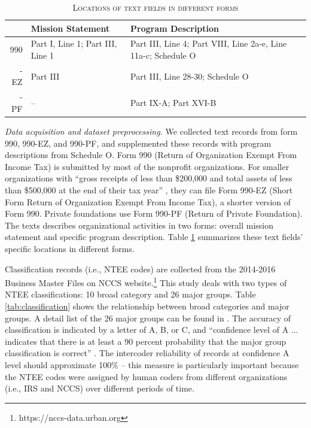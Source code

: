 \documentclass[11pt]{article}
\begin{document}
\begin{table}[]
    \centering
    \begin{tabularx}{0.8\textwidth}{r|X|X}
    	 \hline
         & Mission Statement & Program Description \\
         \hline
         990 & Part I, Line 1; Part III, Line 1 & Part III, Line 4; Part VIII, Line 2a-e, Line 11a-c; Schedule O \\
         \hdashline
         990-EZ & Part III & Part III, Line 28-30; Schedule O \\
         \hdashline
         990-PF & -- & Part IX-A; Part XVI-B \\
         \hline
    \end{tabularx}
    \caption{\textsc{Locations of text fields in different forms}} \label{tab:text_loc}
\end{table}

\textit{Data acquisition and dataset preprocessing.} We collected text records from form 990, 990-EZ, and 990-PF, and supplemented these records with program descriptions from Schedule O. Form 990 (Return of Organization Exempt From Income Tax) is submitted by most of the nonprofit organizations. For smaller organizations with ``gross receipts of less than \$200,000 and total assets of less than \$500,000 at the end of their tax year'' \parencite[1]{USInternalRevenueService2017InstructionsForm2018}, they can file Form 990-EZ (Short Form Return of Organization Exempt From Income Tax), a shorter version of Form 990. Private foundations use Form 990-PF (Return of Private Foundation). The texts describes organizational activities in two forms: overall mission statement and specific program description. Table \ref{tab:text_loc} summarizes these text fields' specific locations in different forms.

Classification records (i.e., NTEE codes) are collected from the 2014-2016 Business Master Files on NCCS website.\footnote{https://nccs-data.urban.org} This study deals with two types of NTEE classifications: 10 broad category and 26 major groups. Table \ref{tab:classification} shows the relationship between broad categories and major groups. A detail list of the 26 major groups can be found in \textcite{USInternalRevenueServiceExemptOrganizationsBusiness2014}. The accuracy of classification is indicated by a letter of A, B, or C, and ``confidence level of A ... indicates that there is at least a 90 percent probability that the major group classification is correct'' \parencite[16]{NationalCenterforCharitableStatisticsGuideUsingNCCS2006}. The intercoder reliability of records at confidence A level should approximate 100\% \parencite[147]{StengelGettingItRight1998} -- this measure is particularly important because the NTEE codes were assigned by human coders from different organizations (i.e., IRS and NCCS) over different periods of time.
\end{document}
